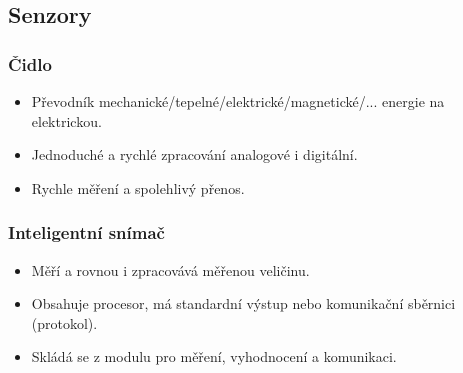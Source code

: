 \subsection{Senzory}

\subsubsection*{Čidlo}
\begin{itemize}
    \item Převodník mechanické/tepelné/elektrické/magnetické/... energie na elektrickou.
    \item Jednoduché a rychlé zpracování analogové i digitální.
    \item Rychle měření a spolehlivý přenos.
\end{itemize}

\subsubsection*{Inteligentní snímač}
\begin{itemize}
    \item Měří a rovnou i zpracovává měřenou veličinu.
    \item Obsahuje procesor, má standardní výstup nebo komunikační sběrnici (protokol).
    \item Skládá se z modulu pro měření, vyhodnocení a komunikaci.
\end{itemize}

